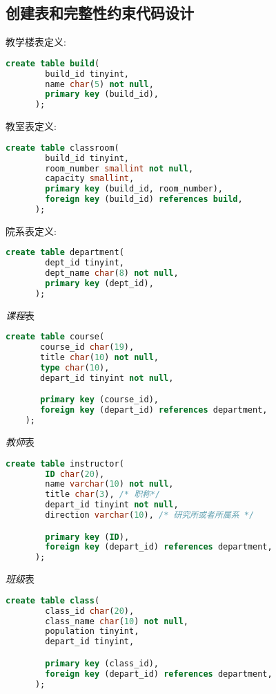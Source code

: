 \documentclass{myreport}
\begin{document}
  \subsection{创建表和完整性约束代码设计}
    教学楼表定义:
    \begin{lstlisting}[language=sql]
      create table build(
        build_id tinyint,
        name char(5) not null,
        primary key (build_id),
      );
    \end{lstlisting}

    教室表定义:
    \begin{lstlisting}[language=sql]
      create table classroom(
        build_id tinyint,
        room_number smallint not null,
        capacity smallint,
        primary key (build_id, room_number),
        foreign key (build_id) references build,
      );
    \end{lstlisting}

    院系表定义:
    \begin{lstlisting}[language=sql]
      create table department(
        dept_id tinyint,
        dept_name char(8) not null,
        primary key (dept_id),
      );
    \end{lstlisting}

    \emph{课程}表
    \begin{lstlisting}[language=sql]
     create table course(
       course_id char(19),
       title char(10) not null,
       type char(10),
       depart_id tinyint not null,

       primary key (course_id),
       foreign key (depart_id) references department,
    );
    \end{lstlisting}

    \emph{教师}表
    \begin{lstlisting}[language=sql]
      create table instructor(
        ID char(20),
        name varchar(10) not null,
        title char(3), /* 职称*/
        depart_id tinyint not null,
        direction varchar(10), /* 研究所或者所属系 */

        primary key (ID),
        foreign key (depart_id) references department,
      );
    \end{lstlisting}

    \emph{班级}表
    \begin{lstlisting}[language=sql]
      create table class(
        class_id char(20),
        class_name char(10) not null,
        population tinyint,
        depart_id tinyint,

        primary key (class_id),
        foreign key (depart_id) references department,
      );
    \end{lstlisting}
\end{document}
